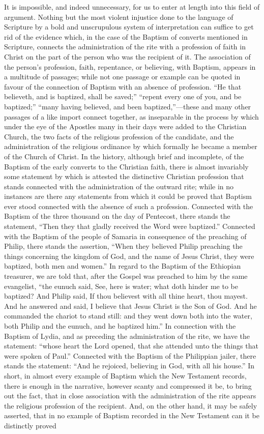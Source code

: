 \documentclass[]{book}
\begin{document}
It is impossible, and indeed unnecessary, for us to enter at length into this field of argument. Nothing but the most violent injustice done to the language of Scripture by a bold and unscrupulous system of interpretation can suffice to get rid of the evidence which, in the case of the Baptism of converts mentioned in Scripture, connects the administration of the rite with a profession of faith in Christ on the part of the person who was the recipient of it. The association of the person's profession, faith, repentance, or believing, with Baptism, appears in a multitude of passages; while not one passage or example can be quoted in favour of the connection of Baptism with an absence of profession. ``He that believeth, and is baptized, shall be saved;'' ``repent every one of you, and be baptized;'' ``many having believed, and been baptized,''---these and many other passages of a like import connect together, as inseparable in the process by which under the eye of the Apostles many in their days were added to the Christian Church, the two facts of the religious profession of the candidate, and the administration of the religious ordinance by which formally he became a member of the Church of Christ. In the history, although brief and incomplete, of the Baptism of the early converts to the Christian faith, there is almost invariably some statement by which is attested the distinctive Christian profession that stands connected with the administration of the outward rite; while in no instances are there any statements from which it could be proved that Baptism ever stood connected with the absence of such a profession. Connected with the Baptism of the three thousand on the day of Pentecost, there stands the statement, ``Then they that gladly received the Word were baptized.'' Connected with the Baptism of the people of Samaria in consequence of the preaching of Philip, there stands the assertion, ``When they believed Philip preaching the things concerning the kingdom of God, and the name of Jesus Christ, they were baptized, both men and women.'' In regard to the Baptism of the Ethiopian treasurer, we are told that, after the Gospel was preached to him by the same evangelist, ``the eunuch said, See, here is water; what doth hinder me to be baptized? And Philip said, If thou believest with all thine heart, thou mayest. And he answered and said, I believe that Jesus Christ is the Son of God. And he commanded the chariot to stand still: and they went down both into the water, both Philip and the eunuch, and he baptized him.'' In connection with the Baptism of Lydia, and as preceding the administration of the rite, we have the statement: ``whose heart the Lord opened, that she attended unto the things that were spoken of Paul.'' Connected with the Baptism of the Philippian jailer, there stands the statement: ``And he rejoiced, believing in God, with all his house.'' In short, in almost every example of Baptism which the New Testament records, there is enough in the narrative, however scanty and compressed it be, to bring out the fact, that in close association with the administration of the rite appears the religious profession of the recipient. And, on the other hand, it may be safely asserted, that in no example of Baptism recorded in the New Testament can it be distinctly proved 
\end{document}
